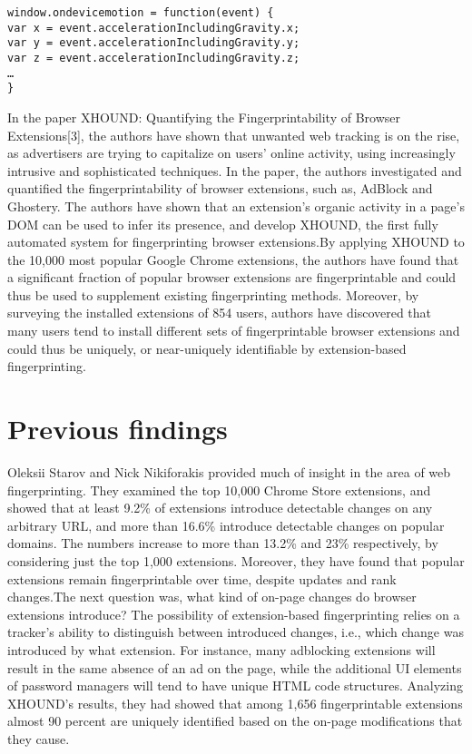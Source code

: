 \documentclass[journal]{IEEEtran}
\begin{document}
\begin{verbatim}
window.ondevicemotion = function(event) {
var x = event.accelerationIncludingGravity.x; 
var y = event.accelerationIncludingGravity.y; 
var z = event.accelerationIncludingGravity.z; 
…
}
\end{verbatim}


In the paper XHOUND: Quantifying the Fingerprintability of Browser
Extensions[3], the authors have shown that unwanted web tracking is on the rise,
as advertisers are trying to capitalize on users’ online activity, using
increasingly intrusive and sophisticated techniques. In the paper, the authors
investigated and quantified the fingerprintability of browser extensions, such
as, AdBlock and Ghostery. The authors have shown that an extension’s organic
activity in a page’s DOM can be used to infer its presence, and develop XHOUND,
the first fully automated system for fingerprinting browser extensions.By
applying XHOUND to the 10,000 most popular Google Chrome extensions, the authors
have found that a significant fraction of popular browser extensions are
fingerprintable and could thus be used to supplement existing fingerprinting
methods. Moreover, by surveying the installed extensions of 854 users, authors
have discovered that many users tend to install different sets of
fingerprintable browser extensions and could thus be uniquely, or near-uniquely
identifiable by extension-based fingerprinting.

\section*{Previous findings}

Oleksii Starov and Nick Nikiforakis provided much of insight in the area of web
fingerprinting. They examined the top 10,000 Chrome Store extensions, and showed that at
least 9.2\% of extensions introduce detectable changes on any arbitrary URL, and more
than 16.6\% introduce detectable changes on popular domains. The numbers increase to more
than 13.2\% and 23\% respectively, by considering just the top 1,000 extensions.
Moreover, they have found that popular extensions remain fingerprintable over time,
despite updates and rank changes.The next question was, what kind of on-page changes do
browser extensions introduce? The possibility of extension-based fingerprinting relies on
a tracker’s ability to distinguish between introduced changes, i.e., which change was
introduced by what extension. For instance, many adblocking extensions will result in the
same absence of an ad on the page, while the additional UI elements of password managers
will tend to have unique HTML code structures. Analyzing XHOUND’s results, they had
showed that among 1,656 fingerprintable extensions almost 90 percent are uniquely
identified based on the on-page modifications that they cause.
\end{document}
